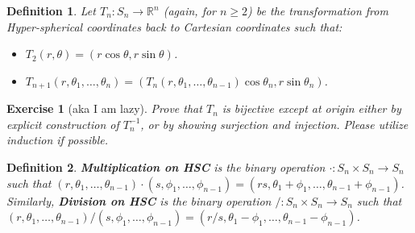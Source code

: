 \documentclass{article}
\theoremstyle{plain}
\newtheorem{definition}{Definition}[section]
\newtheorem{exercise}{Exercise}[section]
\begin{document}
\begin{definition}\label{hsc}
Let $T_n: S_n \rightarrow \mathbb{R}^n$ (again, for $n \ge 2$) be the transformation from Hyper-spherical coordinates back to Cartesian coordinates such that:
\begin{itemize}
	\item $T_2(r, \theta) = (r \cos{\theta}, r \sin{\theta})$.
	\item $T_{n+1}(r, \theta_1, \ldots, \theta_n) = (T_n(r,  \theta_1, \ldots, \theta_{n-1}) \cos{\theta_n}, r \sin{\theta_n})$.
\end{itemize}
\end{definition}

\begin{exercise}[aka I am lazy]
Prove that $T_n$ is bijective \textit{except at origin} either by explicit construction of $T_n^{-1}$, or by showing surjection and injection. Please utilize induction if possible.
\end{exercise}

\begin{definition}
\textbf{Multiplication on HSC} is the binary operation $\cdot: S_n \times S_n \rightarrow S_n$ such that $(r, \theta_1, \ldots, \theta_{n-1}) \cdot (s, \phi_1, \ldots, \phi_{n-1}) = (rs, \theta_1 + \phi_1, \ldots, \theta_{n-1} + \phi_{n-1})$. Similarly, \textbf{Division on HSC} is the binary operation $/: S_n \times S_n \rightarrow S_n$ such that $(r, \theta_1, \ldots, \theta_{n-1}) / (s, \phi_1, \ldots, \phi_{n-1}) = (r/s, \theta_1 - \phi_1, \ldots, \theta_{n-1} - \phi_{n-1})$.
\end{definition}
\end{document}

